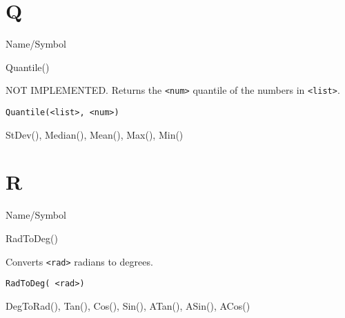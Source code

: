 \rl

\section{Q}
\rl

\begin{desc}{Name/Symbol}
\item[Name/Symbol]	Quantile()

\item[Description]	NOT IMPLEMENTED. Returns the \verb+<num>+ quantile of
		the numbers in \verb+<list>+.

\item[Usage]		
\begin{verbatim}
Quantile(<list>, <num>)
\end{verbatim}

\item[Example]	

\item[See Also]	StDev(), Median(), Mean(), Max(), Min()
\end{desc}

\rl


\section{R}
\rl


\begin{desc}{Name/Symbol}
\item[Name/Symbol] 	RadToDeg() 

\item[Description] 	Converts \verb+<rad>+ radians to degrees.

\item[Usage]		
\begin{verbatim}
RadToDeg( <rad>)			 
\end{verbatim}

\item[Example]	

\item[See Also]     	DegToRad(), Tan(), Cos(), Sin(), ATan(), ASin(), ACos()
\end{desc}

\rl




